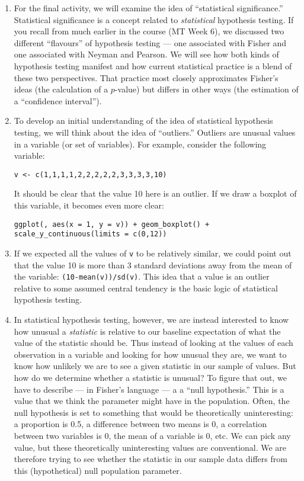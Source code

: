 \documentclass[a4paper,12pt]{article}
\begin{document}
\begin{enumerate}

\item For the final activity, we will examine the idea of ``statistical significance.'' Statistical significance is a concept related to \textit{statistical} hypothesis testing. If you recall from much earlier in the course (MT Week 6), we discussed two different ``flavours'' of hypothesis testing --- one associated with Fisher and one associated with Neyman and Pearson. We will see how both kinds of hypothesis testing manifest and how current statistical practice is a blend of these two perspectives. That practice most closely approximates Fisher's ideas (the calculation of a $p$-value) but differs in other ways (the estimation of a ``confidence interval'').

\item To develop an initial understanding of the idea of statistical hypothesis testing, we will think about the idea of ``outliers.'' Outliers are unusual values in a variable (or set of variables). For example, consider the following variable:

\begin{verbatim}
v <- c(1,1,1,1,2,2,2,2,2,3,3,3,3,10)
\end{verbatim}

\noindent It should be clear that the value 10 here is an outlier. If we draw a boxplot of this variable, it becomes even more clear:

\begin{verbatim}
ggplot(, aes(x = 1, y = v)) + geom_boxplot() + scale_y_continuous(limits = c(0,12))
\end{verbatim}

\item If we expected all the values of \texttt{v} to be relatively similar, we could point out that the value 10 is more than 3 standard deviations away from the mean of the variable: \texttt{(10-mean(v))/sd(v)}. This idea that a value is an outlier relative to some assumed central tendency is the basic logic of statistical hypothesis testing.

\item In statistical hypothesis testing, however, we are instead interested to know how unusual a \textit{statistic} is relative to our baseline expectation of what the value of the statistic should be. Thus instead of looking at the values of each observation in a variable and looking for how unusual they are, we want to know how unlikely we are to see a given statistic in our sample of values. But how do we determine whether a statistic is unusual? To figure that out, we have to describe --- in Fisher's language --- a a ``null hypothesis.'' This is a value that we think the parameter might have in the population. Often, the null hypothesis is set to something that would be theoretically uninteresting: a proportion is 0.5, a difference between two means is 0, a correlation between two variables is 0, the mean of a variable is 0, etc. We can pick any value, but these theoretically uninteresting values are conventional. We are therefore trying to see whether the statistic in our sample data differs from this (hypothetical) null population parameter.


\end{enumerate}
\end{document}
